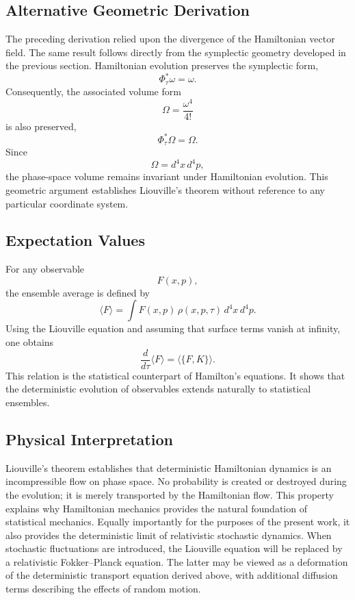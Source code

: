 \subsection{Alternative Geometric Derivation}
The preceding derivation relied upon the divergence of the Hamiltonian
vector field.
The same result follows directly from the symplectic geometry developed
in the previous section.
Hamiltonian evolution preserves the symplectic form,
\[\Phi_\tau^*\omega=\omega.\]
Consequently, the associated volume form
\[\Omega=\frac{\omega^4}{4!}\]
is also preserved,
\[\Phi_\tau^*\Omega=\Omega.\]
Since
\[\Omega=d^4x\,d^4p,\]
the phase-space volume remains invariant under Hamiltonian evolution.
This geometric argument establishes Liouville's theorem without
reference to any particular coordinate system.
\subsection{Expectation Values}
For any observable
\[F(x,p),\]
the ensemble average is defined by
\[\boxed{\langle F\rangle=\int F(x,p)\,\rho(x,p,\tau)\,d^4x\,d^4p.}\]
Using the Liouville equation and assuming that surface terms vanish at
infinity, one obtains
\[\frac{d}{d\tau}\langle F\rangle=\langle\{F,K\}\rangle.\]
This relation is the statistical counterpart of Hamilton's equations.
It shows that the deterministic evolution of observables extends
naturally to statistical ensembles.
\subsection{Physical Interpretation}
Liouville's theorem establishes that deterministic Hamiltonian dynamics
is an incompressible flow on phase space.
No probability is created or destroyed during the evolution; it is
merely transported by the Hamiltonian flow.
This property explains why Hamiltonian mechanics provides the natural
foundation of statistical mechanics.
Equally importantly for the purposes of the present work, it also
provides the deterministic limit of relativistic stochastic dynamics.
When stochastic fluctuations are introduced, the Liouville equation will
be replaced by a relativistic Fokker--Planck equation. The latter may be
viewed as a deformation of the deterministic transport equation derived
above, with additional diffusion terms describing the effects of random
motion.
